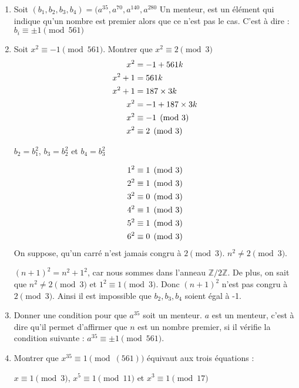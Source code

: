 \documentclass[a4paper,10pt]{article}
\newcommand{\Z}{\mathbb{Z}}
\begin{document}
	\begin{enumerate}
	\item
	Soit $(b_1,b_2,b_3,b_4)=(a^{35},a^{70},a^{140},a^{280}$
	Un menteur, est un élément qui indique qu'un nombre est premier alors que ce n'est pas le cas. C'est à dire : $b_i\equiv \pm 1\pmod{561}$
	\item
		Soit $x^2\equiv -1\pmod{561}$. Montrer que $x^2\equiv 2\pmod {3}$
		\begin{align}
			x^2 &= -1 + 561k \notag \\
			x^2 +1 &= 561k \notag \\
			x^2+1 &= 187 \times 3k \notag \\
			x^2 &= -1+187 \times 3k \notag \\
			x^2 &\equiv -1\pmod{3} \notag \\
			x^2 &\equiv 2\pmod{3} \notag
		\end{align}
		
		$b_2=b_1^2$, $b_3=b_2^2$ et $b_4=b_3^2$
		
		\begin{align}
			1^2 &\equiv 1 \pmod{3} \notag \\
			2^2 &\equiv 1 \pmod{3} \notag \\
			3^2 &\equiv 0 \pmod{3} \notag \\
			4^2 &\equiv 1 \pmod{3} \notag \\
			5^2 &\equiv 1 \pmod{3} \notag \\
			6^2 &\equiv 0 \pmod{3} \notag
		\end{align}				
		On suppose, qu'un carré n'est jamais congru à $2\pmod{3}$. $n^2 \neq 2\pmod{3}$.
		
		$(n+1)^2=n^2+1^2$, car nous sommes dans l'anneau $\Z/2\Z$.
		De plus, on sait que $n^2 \neq 2\pmod{3}$ et $1^2 \equiv 1 \pmod{3}$.
		Donc $(n+1)^2$ n'est pas congru à  $2\pmod{3}$. Ainsi il est impossible que $b_2,b_3,b_4$ soient égal à -1.
		
		
	
	\item
	Donner une condition pour que $a^{35}$ soit un menteur.
	$a$ est un menteur, c'est à dire qu'il permet d'affirmer que $n$ est un nombre premier, si il vérifie la condition suivante :
	$a^{35}\equiv \pm1 \pmod{561}$.
	\item
	Montrer que $x^35\equiv 1\pmod(561)$ équivaut aux trois équations :
	
	\begin{center}
	$x \equiv 1\pmod{3}$, $  x^5\equiv 1 \pmod{11}$ et $x^3\equiv 1 \pmod{17}$
		\end{center}
	

\end{enumerate}
\end{document}
